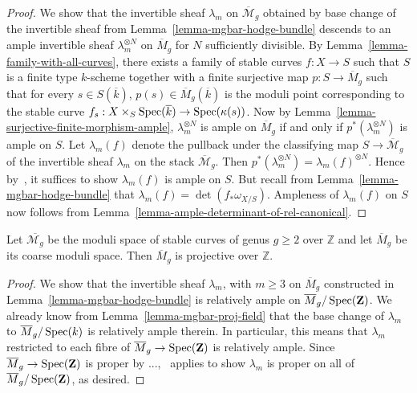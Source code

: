 \begin{proof}
We show that the invertible sheaf $\lambda_m$ on $\overline{\mathcal{M}}_g$
obtained by base change of the invertible sheaf from
Lemma~\ref{lemma-mgbar-hodge-bundle} descends to an ample
invertible sheaf $\lambda_m^{\otimes N}$ on $\overline{M}_g$ for $N$
sufficiently divisible.
By Lemma~\ref{lemma-family-with-all-curves}, there exists a family of stable
curves $f : X \to S$ such that $S$ is a finite type $k$-scheme together with
a finite surjective map $p : S \to \overline{M}_g$ such that for every
$s \in S(\overline k)$, $p(s) \in \overline{M}_g(\overline k)$ is
the moduli point corresponding to the stable curve
$f_s : X \times_S \mathop{\rm Spec}(\overline k) \to \mathop{\rm Spec}(\kappa(s))$.
Now by Lemma~\ref{lemma-surjective-finite-morphism-ample},
$\lambda_m^{\otimes N}$ is ample on $\overline{M}_g$ if and only if
$p^*(\lambda_m^{\otimes N})$ is ample on $S$.
Let $\lambda_m(f)$ denote the pullback under the classifying map
$S \to \overline{\mathcal{M}}_g$ of the invertible sheaf $\lambda_m$ on the
stack $\overline{\mathcal{M}}_g$.
Then $p^*(\lambda_m^{\otimes N}) = \lambda_m(f)^{\otimes N}$.
Hence by~, it suffices to show $\lambda_m(f)$ is ample on $S$.
But recall from Lemma~\ref{lemma-mgbar-hodge-bundle} that
$\lambda_m(f) = \det(f_*\omega_{X/S})$.
Ampleness of $\lambda_m(f)$ on $S$ now follows from
Lemma~\ref{lemma-ample-determinant-of-rel-canonical}.
\end{proof}


\begin{theorem}
\label{theorem-mgbar-proj}
Let $\overline{\mathcal{M}_g}$ be the moduli space of stable curves of genus
$g \geq 2$ over $\mathbb{Z}$ and let $\overline{M}_g$ be its coarse moduli
space.
Then $\overline{M}_g$ is projective over $\mathbb{Z}$.
\end{theorem}

\begin{proof}
We show that the invertible sheaf $\lambda_m$, with $m \geq 3$ on
$\overline{M}_g$ constructed in Lemma~\ref{lemma-mgbar-hodge-bundle} is
relatively ample on $\overline{M}_g/\mathop{\rm Spec}(\mathbf{Z})$.
We already know from Lemma~\ref{lemma-mgbar-proj-field} that the base
change of $\lambda_m$ to $\overline{M}_g/\mathop{\rm Spec}(k)$ is relatively ample therein.
In particular, this means that $\lambda_m$ restricted to each fibre of
$\overline{M}_g \to \mathop{\rm Spec}(\mathbf{Z})$ is relatively ample.
Since $\overline{M}_g \to \mathop{\rm Spec}(\mathbf{Z})$ is proper by ...,~ applies to show $\lambda_m$ is proper
on all of $\overline{M}_g/\mathop{\rm Spec}(\mathbf{Z})$, as desired.
\end{proof}




